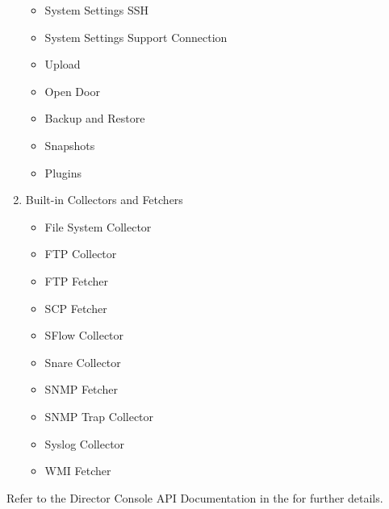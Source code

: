 \documentclass[letterpaper,10pt,oneside,english]{sphinxmanual}
\begin{document}
\begin{enumerate}
\begin{itemize}
\item {} 
System Settings SSH

\item {} 
System Settings Support Connection

\item {} 
Upload

\item {} 
Open Door

\item {} 
Backup and Restore

\item {} 
Snapshots

\item {} 
Plugins

\end{itemize}

\item {} 
Built-in Collectors and Fetchers
\begin{itemize}
\item {} 
File System Collector

\item {} 
FTP Collector

\item {} 
FTP Fetcher

\item {} 
SCP Fetcher

\item {} 
SFlow Collector

\item {} 
Snare Collector

\item {} 
SNMP Fetcher

\item {} 
SNMP Trap Collector

\item {} 
Syslog Collector

\item {} 
WMI Fetcher

\end{itemize}

\end{enumerate}

Refer to the Director Console API Documentation in the  for further details.
\end{document}

